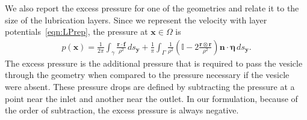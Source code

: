 \documentclass[twoside,twocolumn,9pt]{article}
\newcommand{\ff}{\mathbf{f}}
\newcommand{\eeta}{\boldsymbol{\eta}}
\newcommand{\nn}{\mathbf{n}}
\newcommand{\rr}{\mathbf{r}}
\renewcommand{\ss}{\mathbf{s}}
\newcommand{\uu}{\mathbf{u}}
\newcommand{\xx}{\mathbf{x}}
\newcommand{\yy}{\mathbf{y}}
\begin{document}
We also report the excess pressure for one of the geometries and relate it to the size of the lubrication layers. Since we represent the velocity with layer potentials~\eqref{eqn:LPrep}, the pressure at $\xx \in \Omega$ is
\begin{align}
    p(\xx) = \frac{1}{2\pi} \int_{\gamma} \frac{\rr \cdot \ff}{\rho^2} \, ds_\yy + \frac{1}{\pi} \int_{\Gamma} \frac{1}{\rho^2} \left(\mathds{I} - 2\frac{\rr \otimes \rr}{\rho^2} \right) \nn \cdot \eeta \, ds_\yy.
\end{align}
The excess pressure is the additional pressure that is required to pass the vesicle through the geometry when compared to the pressure necessary if the vesicle were absent. These pressure drops are defined by subtracting the pressure at a point near the inlet and another near the outlet. In our formulation, because of the order of subtraction, the excess pressure is always negative.




\end{document}
